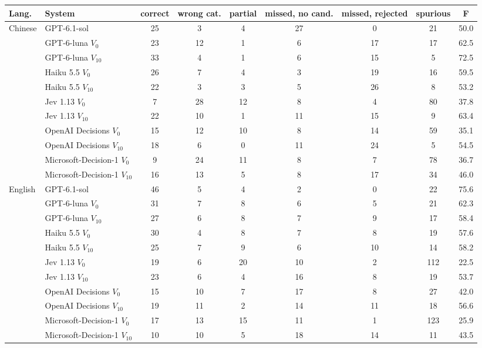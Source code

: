 \begin{tabular}{@{}llccccccc@{}}
\toprule
Lang. & System & correct & wrong cat. & partial & missed, no cand. & missed, rejected & spurious & F \\
\midrule
Chinese & GPT-6.1-sol & 25 & 3 & 4 & 27 & 0 & 21 & 50.0 \\
 & GPT-6-luna $V_{0}$ & 23 & 12 & 1 & 6 & 17 & 17 & 62.5 \\
 & GPT-6-luna $V_{10}$ & 33 & 4 & 1 & 6 & 15 & 5 & 72.5 \\
 & Haiku 5.5 $V_{0}$ & 26 & 7 & 4 & 3 & 19 & 16 & 59.5 \\
 & Haiku 5.5 $V_{10}$ & 22 & 3 & 3 & 5 & 26 & 8 & 53.2 \\
 & Jev 1.13 $V_{0}$ & 7 & 28 & 12 & 8 & 4 & 80 & 37.8 \\
 & Jev 1.13 $V_{10}$ & 22 & 10 & 1 & 11 & 15 & 9 & 63.4 \\
 & OpenAI Decisions $V_{0}$ & 15 & 12 & 10 & 8 & 14 & 59 & 35.1 \\
 & OpenAI Decisions $V_{10}$ & 18 & 6 & 0 & 11 & 24 & 5 & 54.5 \\
 & Microsoft-Decision-1 $V_{0}$ & 9 & 24 & 11 & 8 & 7 & 78 & 36.7 \\
 & Microsoft-Decision-1 $V_{10}$ & 16 & 13 & 5 & 8 & 17 & 34 & 46.0 \\
\midrule
English & GPT-6.1-sol & 46 & 5 & 4 & 2 & 0 & 22 & 75.6 \\
 & GPT-6-luna $V_{0}$ & 31 & 7 & 8 & 6 & 5 & 21 & 62.3 \\
 & GPT-6-luna $V_{10}$ & 27 & 6 & 8 & 7 & 9 & 17 & 58.4 \\
 & Haiku 5.5 $V_{0}$ & 30 & 4 & 8 & 7 & 8 & 19 & 57.6 \\
 & Haiku 5.5 $V_{10}$ & 25 & 7 & 9 & 6 & 10 & 14 & 58.2 \\
 & Jev 1.13 $V_{0}$ & 19 & 6 & 20 & 10 & 2 & 112 & 22.5 \\
 & Jev 1.13 $V_{10}$ & 23 & 6 & 4 & 16 & 8 & 19 & 53.7 \\
 & OpenAI Decisions $V_{0}$ & 15 & 10 & 7 & 17 & 8 & 27 & 42.0 \\
 & OpenAI Decisions $V_{10}$ & 19 & 11 & 2 & 14 & 11 & 18 & 56.6 \\
 & Microsoft-Decision-1 $V_{0}$ & 17 & 13 & 15 & 11 & 1 & 123 & 25.9 \\
 & Microsoft-Decision-1 $V_{10}$ & 10 & 10 & 5 & 18 & 14 & 11 & 43.5 \\

\bottomrule
\end{tabular}

